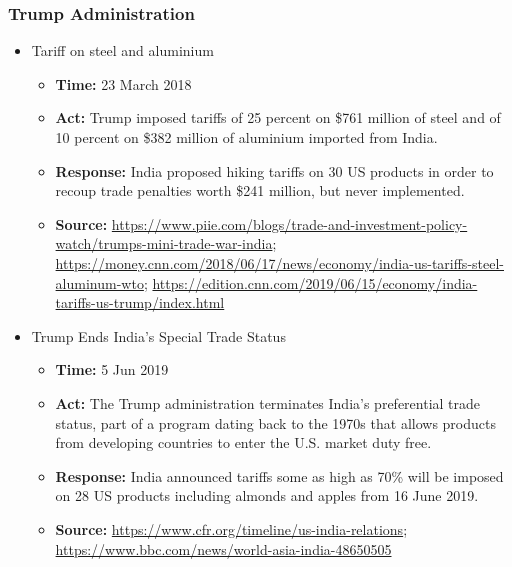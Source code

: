 		\subsubsection{Trump Administration}
			\begin{itemize}
			\item Tariff on steel and aluminium
				\begin{itemize}
				\item \textbf{Time: }23 March 2018
				\item \textbf{Act: }Trump imposed tariffs of 25 percent on \$761 million of steel and of 10 percent on \$382 million of aluminium imported from India.
				\item \textbf{Response: }India proposed hiking tariffs on 30 US products in order to recoup trade penalties worth \$241 million, but never implemented.
				\item	\textbf{Source: }\url{https://www.piie.com/blogs/trade-and-investment-policy-watch/trumps-mini-trade-war-india}; \url{https://money.cnn.com/2018/06/17/news/economy/india-us-tariffs-steel-aluminum-wto}; \url{https://edition.cnn.com/2019/06/15/economy/india-tariffs-us-trump/index.html}
				\end{itemize}

			\item	Trump Ends India’s Special Trade Status
				\begin{itemize}
				\item \textbf{Time: }5 Jun 2019
				\item \textbf{Act: }The Trump administration terminates India’s preferential trade status, part of a program dating back to the 1970s that allows products from developing countries to enter the U.S. market duty free.
				\item \textbf{Response: }India announced tariffs some as high as 70\% will be imposed on 28 US products including almonds and apples from 16 June 2019.
				\item	\textbf{Source: }\url{https://www.cfr.org/timeline/us-india-relations}; \url{https://www.bbc.com/news/world-asia-india-48650505}
				\end{itemize}

			\end{itemize}
			
